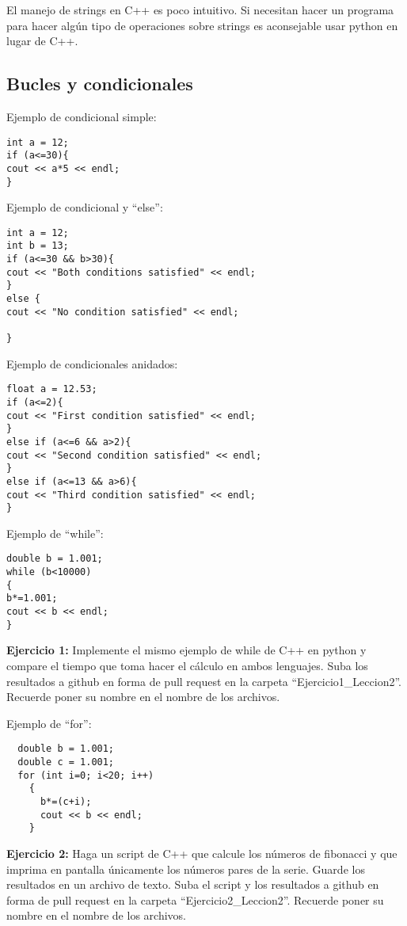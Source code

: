 \documentclass[10.5pt]{article}
\begin{document}
El manejo de strings en C++ es poco intuitivo. Si necesitan hacer un programa para hacer algún tipo de operaciones sobre strings es aconsejable usar python en lugar de C++.

\subsection{Bucles y condicionales}

Ejemplo de condicional simple:
\begin{verbatim}
int a = 12;
if (a<=30){
cout << a*5 << endl;
}
\end{verbatim}

Ejemplo de condicional y ``else'':
\begin{verbatim}
int a = 12;
int b = 13;
if (a<=30 && b>30){
cout << "Both conditions satisfied" << endl;
}
else {
cout << "No condition satisfied" << endl;

}
\end{verbatim}

Ejemplo de condicionales anidados:
\begin{verbatim}
float a = 12.53;
if (a<=2){
cout << "First condition satisfied" << endl;
}
else if (a<=6 && a>2){
cout << "Second condition satisfied" << endl;
}
else if (a<=13 && a>6){
cout << "Third condition satisfied" << endl;
}
\end{verbatim}

Ejemplo de ``while'':
\begin{verbatim}
double b = 1.001;
while (b<10000)
{
b*=1.001;
cout << b << endl; 
}
\end{verbatim}

{\textbf{Ejercicio 1:}} Implemente el mismo ejemplo de while de C++ en python y compare el tiempo que toma hacer el cálculo en ambos lenguajes. Suba los resultados a github en forma de pull request en la carpeta ``Ejercicio1\_Leccion2''.  Recuerde poner su nombre en el nombre de los archivos.



Ejemplo de ``for'':
\begin{verbatim}
  double b = 1.001;
  double c = 1.001;
  for (int i=0; i<20; i++)
    {
      b*=(c+i);
      cout << b << endl;
    }
\end{verbatim}

{\textbf{Ejercicio 2:}} Haga un script de C++ que calcule los números de fibonacci y que imprima en pantalla únicamente los números pares de la serie. Guarde los resultados en un archivo de texto. Suba el script y los resultados a github en forma de pull request en la carpeta ``Ejercicio2\_Leccion2''. Recuerde poner su nombre en el nombre de los archivos.
\end{document}
